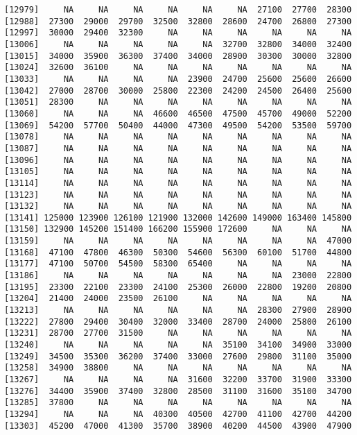 \documentclass[]{article}
\begin{document}
\begin{verbatim}
[12979]     NA     NA     NA     NA     NA     NA  27100  27700  28300
[12988]  27300  29000  29700  32500  32800  28600  24700  26800  27300
[12997]  30000  29400  32300     NA     NA     NA     NA     NA     NA
[13006]     NA     NA     NA     NA     NA  32700  32800  34000  32400
[13015]  34000  35900  36300  37400  34000  28900  30300  30000  32800
[13024]  32600  36100     NA     NA     NA     NA     NA     NA     NA
[13033]     NA     NA     NA     NA  23900  24700  25600  25600  26600
[13042]  27000  28700  30000  25800  22300  24200  24500  26400  25600
[13051]  28300     NA     NA     NA     NA     NA     NA     NA     NA
[13060]     NA     NA     NA  46600  46500  47500  45700  49000  52200
[13069]  54200  57700  50400  44000  47300  49500  54200  53500  59700
[13078]     NA     NA     NA     NA     NA     NA     NA     NA     NA
[13087]     NA     NA     NA     NA     NA     NA     NA     NA     NA
[13096]     NA     NA     NA     NA     NA     NA     NA     NA     NA
[13105]     NA     NA     NA     NA     NA     NA     NA     NA     NA
[13114]     NA     NA     NA     NA     NA     NA     NA     NA     NA
[13123]     NA     NA     NA     NA     NA     NA     NA     NA     NA
[13132]     NA     NA     NA     NA     NA     NA     NA     NA     NA
[13141] 125000 123900 126100 121900 132000 142600 149000 163400 145800
[13150] 132900 145200 151400 166200 155900 172600     NA     NA     NA
[13159]     NA     NA     NA     NA     NA     NA     NA     NA  47000
[13168]  47100  47800  46300  50300  54600  56300  60100  51700  44800
[13177]  47100  50700  54500  58300  65400     NA     NA     NA     NA
[13186]     NA     NA     NA     NA     NA     NA     NA  23000  22800
[13195]  23300  22100  23300  24100  25300  26000  22800  19200  20800
[13204]  21400  24000  23500  26100     NA     NA     NA     NA     NA
[13213]     NA     NA     NA     NA     NA     NA  28300  27900  28900
[13222]  27800  29400  30400  32000  33400  28700  24000  25800  26100
[13231]  28700  27700  31500     NA     NA     NA     NA     NA     NA
[13240]     NA     NA     NA     NA     NA  35100  34100  34900  33000
[13249]  34500  35300  36200  37400  33000  27600  29800  31100  35000
[13258]  34900  38800     NA     NA     NA     NA     NA     NA     NA
[13267]     NA     NA     NA     NA  31600  32200  33700  31900  33300
[13276]  34400  35900  37400  32800  28500  31100  31600  35100  34700
[13285]  37800     NA     NA     NA     NA     NA     NA     NA     NA
[13294]     NA     NA     NA  40300  40500  42700  41100  42700  44200
[13303]  45200  47000  41300  35700  38900  40200  44500  43900  47900

\end{verbatim}
\end{document}
